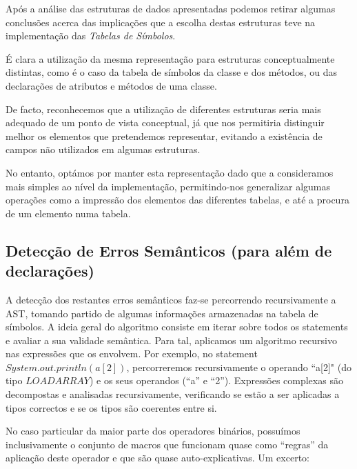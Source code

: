 \documentclass[11pt,a4paper]{article}
\begin{document}
	Após a análise das estruturas de dados apresentadas podemos retirar algumas conclusões acerca das implicações que a escolha destas estruturas teve na implementação das \emph{Tabelas de Símbolos}.
	
	É clara a utilização da mesma representação para estruturas conceptualmente distintas, como é o caso da tabela de símbolos da classe e dos métodos, ou das declarações de atributos e métodos de uma classe.
	
	De facto, reconhecemos que a utilização de diferentes estruturas seria mais adequado de um ponto de vista conceptual, já que nos permitiria distinguir melhor os elementos que pretendemos representar, evitando a existência de campos não utilizados em algumas estruturas.
	
	No entanto, optámos por manter esta representação dado que a consideramos mais simples ao nível da implementação, permitindo-nos generalizar algumas operações como a impressão dos elementos das diferentes tabelas, e até a procura de um elemento numa tabela.
	
	\pagebreak
	
	\subsection{Detecção de Erros Semânticos (para além de declarações)}
	
	A detecção dos restantes erros semânticos faz-se percorrendo recursivamente a AST, tomando partido de algumas informações armazenadas na tabela de símbolos. A ideia geral do algoritmo consiste em iterar sobre todos os statements e avaliar a sua validade semântica. Para tal, aplicamos um algoritmo recursivo nas expressões que os envolvem. Por exemplo, no statement $System.out.println(a[2])$, percorreremos recursivamente o operando ``a[2]" (do tipo $LOADARRAY$) e os seus operandos (``a'' e ``2''). Expressões complexas são decompostas e analisadas recursivamente, verificando se estão a ser aplicadas a tipos correctos e se os tipos são coerentes entre si.
	
	No caso particular da maior parte dos operadores binários, possuímos inclusivamente o conjunto de macros que funcionam quase como ``regras'' da aplicação deste operador e que são quase auto-explicativas. Um excerto:
	
\end{document}
